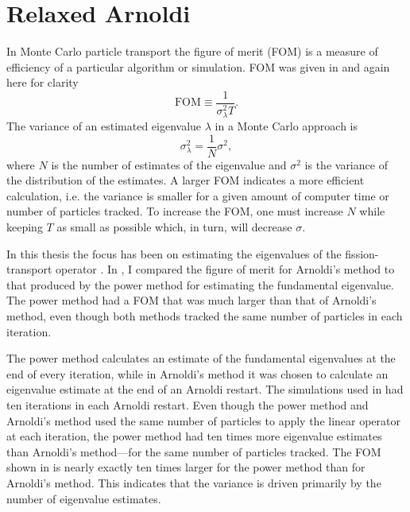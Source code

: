 
\chapter{Relaxed Arnoldi \label{ch:RelaxedArnoldi}}
In Monte Carlo particle transport the figure of merit (FOM) is a measure of efficiency of a particular algorithm or simulation.  FOM was given in  and again here for clarity
\begin{equation}
    \mathrm{FOM} \equiv \frac{1}{\sigma_{\lambda}^2T}.
    \label{eq:FOMRelaxed}
\end{equation}
The variance of an estimated eigenvalue $\lambda$ in a Monte Carlo approach is
\begin{equation}
    \sigma_{\lambda}^2 = \frac{1}{N}\sigma^2,
    \label{eq:SampleVariance}
\end{equation}
where $N$ is the number of estimates of the eigenvalue and $\sigma^2$ is the variance of the distribution of the estimates.  A larger FOM indicates a more efficient calculation, i.e. the variance is smaller for a given amount of computer time or number of particles tracked.  To increase the FOM, one must increase $N$ while keeping $T$ as small as possible which, in turn, will decrease $\sigma$.

In this thesis the focus has been on estimating the eigenvalues of the fission-transport operator \A. In , I compared the figure of merit for Arnoldi's method to that produced by the power method for estimating the fundamental eigenvalue.  The power method had a FOM that was much larger than that of Arnoldi's method, even though both methods tracked the same number of particles in each iteration.  

The power method calculates an estimate of the fundamental eigenvalues at the end of every iteration, while in Arnoldi's method it was chosen to calculate an eigenvalue estimate at the end of an Arnoldi restart.  The simulations used in  had ten iterations in each Arnoldi restart.  Even though the power method and Arnoldi's method used the same number of particles to apply the linear operator at each iteration, the power method had ten times more eigenvalue estimates than Arnoldi's method---for the same number of particles tracked.  The FOM shown in  is nearly exactly ten times larger for the power method than for Arnoldi's method.  This indicates that the variance is driven primarily by the number of eigenvalue estimates.  

